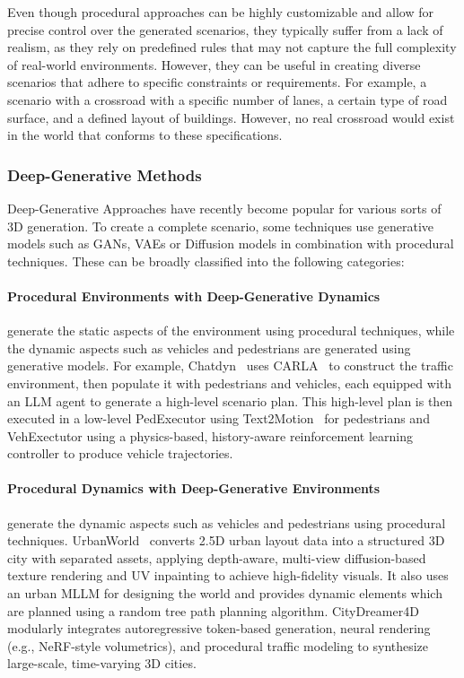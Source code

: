 \documentclass{article}
\begin{document}
Even though procedural approaches can be highly customizable and allow for precise control over the generated scenarios, they typically suffer from a lack of realism, as they rely on predefined rules that may not capture the full complexity of real-world environments. However, they can be useful in creating diverse scenarios that adhere to specific constraints or requirements. For example, a scenario with a crossroad with a specific number of lanes, a certain type of road surface, and a defined layout of buildings. However, no real crossroad would exist in the world that conforms to these specifications.

\subsubsection{Deep-Generative Methods}

Deep-Generative Approaches have recently become popular for various sorts of 3D generation. To create a complete scenario, some techniques use generative models such as GANs, VAEs or Diffusion models in combination with procedural techniques. These can be broadly classified into the following categories:

\paragraph{Procedural Environments with Deep-Generative Dynamics} generate the static aspects of the environment using procedural techniques, while the dynamic aspects such as vehicles and pedestrians are generated using generative models. For example, Chatdyn~\cite{wei2024chatdyn} uses CARLA~\cite{dosovitskiy2017carla} to construct the traffic environment, then populate it with pedestrians and vehicles, each equipped with an LLM agent to generate a high-level scenario plan. This high-level plan is then executed in a low-level PedExecutor using Text2Motion~\cite{guo2024momask} for pedestrians and VehExectutor using a physics-based, history-aware reinforcement learning controller to produce vehicle trajectories.

\paragraph{Procedural Dynamics with Deep-Generative Environments} generate the dynamic aspects such as vehicles and pedestrians using procedural techniques. UrbanWorld~\cite{shang2024urbanworld} converts 2.5D urban layout data into a structured 3D city with separated assets, applying depth-aware, multi-view diffusion-based texture rendering and UV inpainting to achieve high-fidelity visuals. It also uses an urban MLLM for designing the world and provides dynamic elements which are planned using a random tree path planning algorithm. CityDreamer4D~\cite{xie2024citydreamer} modularly integrates autoregressive token-based generation, neural rendering (e.g., NeRF-style volumetrics), and procedural traffic modeling to synthesize large-scale, time-varying 3D cities.
\end{document}
